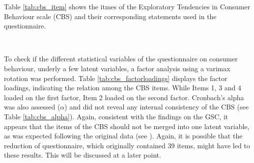 Table \ref{tab:cbs_item} shows the itmes of the Exploratory Tendencies in Consumer Behaviour scale  (CBS) and their corresponding statements used in the questionnaire. 
\begin{table}[!ht]
	\centering
	\\
	\caption{Exploratory Tendencies in Consumer Behaviour items and the corresponding statements.}
	\label{tab:cbs_item}
\end{table}
To check if the different statistical variables of the questionnaire on consumer behaviour, underly a few latent variables, a factor analysis using a varimax rotation was performed. Table \ref{tab:cbs_factorloadings} displays the factor loadings, indicating the relation among the CBS items. While Items 1, 3 and 4 loaded on the first factor, Item 2 loaded on the second factor. Cronbach’s alpha was also assessed ($\alpha$) and did not reveal any internal consistency of the CBS (see Table \ref{tab:cbs_alpha}). Again, consistent with the findings on the GSC, it appears that the items of the CBS should not be merged into one latent variable, as was expected following the original data (see \cite{raju1980optimum}). Again, it is possible that the reduction of questionnaire, which originally contained 39 items, might have led to these results. This will be discussed at a later point.
\begin{table}[!ht]
	\centering
	\\
	\caption{Results of the orthogonal rotated factor loadings (CBS). Highest factor loading in bold displayed.}
	\label{tab:cbs_factorloadings}
\end{table}
